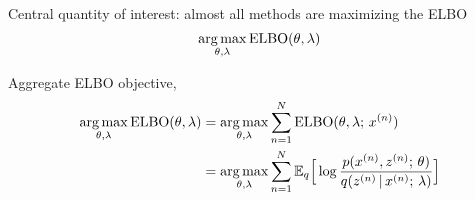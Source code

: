 \begin{frame}


 Central quantity of interest: almost all methods are maximizing the ELBO
    \[ \argmax_{\theta, \lambda} \ELBO(\theta, \lambda)\] 

\pause

Aggregate ELBO objective, 
    \begin{align*}
        \argmax_{\theta, \lambda} \ELBO(\theta, \lambda)  &=\argmax_{\theta, \lambda}\sum_{n=1}^{N} \ELBO(\theta, \lambda \param x^{(n)})\\
        &= \argmax_{\theta, \lambda} \sum_{n=1}^N \E_{ q}\Big[\log \frac{p(x^{(n)}, z^{(n)} \param \theta)}{q(z^{(n)} \given x^{(n)} \param \lambda)} \Big] 
    \end{align*}
    \air

\end{frame}

